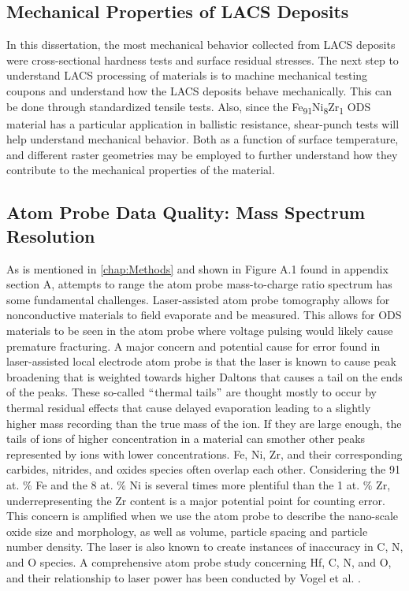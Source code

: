 	\subsection*{Mechanical Properties of LACS Deposits}
		In this dissertation, the most mechanical behavior collected from LACS deposits were cross-sectional hardness tests and surface residual stresses. The next step to understand LACS processing of materials is to machine mechanical testing coupons and understand how the LACS deposits behave mechanically. This can be done through standardized tensile tests. Also, since the Fe\textsubscript{91}Ni\textsubscript{8}Zr\textsubscript{1} ODS material has a particular application in ballistic resistance, shear-punch tests \cite{RN266,RN303} will help understand mechanical behavior. Both as a function of surface temperature, and different raster geometries may be employed to further understand how they contribute to the mechanical properties of the material. 
	
	\subsection*{Atom Probe Data Quality: Mass Spectrum Resolution}
		As is mentioned in \ref{chap:Methods} and shown in Figure A.1 found in appendix section A, attempts to range the atom probe mass-to-charge ratio spectrum has some fundamental challenges. Laser-assisted atom probe tomography allows for nonconductive materials to field evaporate and be measured. This allows for ODS materials to be seen in the atom probe where voltage pulsing would likely cause premature fracturing. A major concern and potential cause for error found in laser-assisted local electrode atom probe is that the laser is known to cause peak broadening that is weighted towards higher Daltons that causes a tail on the ends of the peaks. These so-called $``$thermal tails$"$  are thought mostly to occur by thermal residual effects that cause delayed evaporation leading to a slightly higher mass recording than the true mass of the ion. If they are large enough, the tails of ions of higher concentration in a material can smother other peaks represented by ions with lower concentrations. Fe, Ni, Zr, and their corresponding carbides, nitrides, and oxides species often overlap each other. Considering the 91 at. $\%$  Fe and the 8 at. $\%$  Ni is several times more plentiful than the 1 at. $\%$  Zr, underrepresenting the Zr content is a major potential point for counting error. This concern is amplified when we use the atom probe to describe the nano-scale oxide size and morphology, as well as volume, particle spacing and particle number density. The laser is also known to create instances of inaccuracy in C, N, and O species. A comprehensive atom probe study concerning Hf, C, N, and O, and their relationship to laser power has been conducted by Vogel et al. \cite{RN3367,RN2627}.
		
